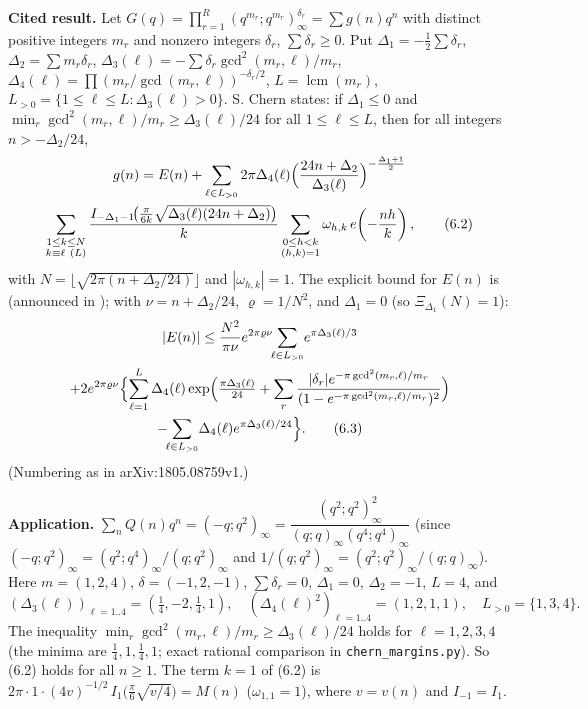\textbf{Cited result.} Let \(G(q)=\prod_{r=1}^{R}(q^{m_r};q^{m_r})_\infty^{\delta_r}=\sum g(n)q^n\) with distinct positive integers \(m_r\) and nonzero integers \(\delta_r\), \(\sum\delta_r\ge0\). Put \(\Delta_1=-\frac12\sum\delta_r\), \(\Delta_2=\sum m_r\delta_r\), \(\Delta_3(\ell)=-\sum\delta_r\gcd^2(m_r,\ell)/m_r\), \(\Delta_4(\ell)=\prod(m_r/\gcd(m_r,\ell))^{-\delta_r/2}\), \(L=\operatorname{lcm}(m_r)\), \(L_{>0}=\{1\le\ell\le L:\Delta_3(\ell)>0\}\). S. Chern \cite[Theorem~1.1]{Chern} states: if \(\Delta_1\le0\) and \(\min_r\gcd^2(m_r,\ell)/m_r\ge\Delta_3(\ell)/24\) for all \(1\le\ell\le L\), then for all integers \(n>-\Delta_2/24\),
\begin{multline}g(n)=E(n)+\sum_{\ell\in L_{>0}}2\pi\Delta_4(\ell)\Bigl(\frac{24n+\Delta_2}{\Delta_3(\ell)}\Bigr)^{-\frac{\Delta_1+1}{2}}\\\sum_{\substack{1\le k\le N\\ k\equiv\ell\ (L)}}\frac{I_{-\Delta_1-1}\!\bigl(\frac{\pi}{6k}\sqrt{\Delta_3(\ell)(24n+\Delta_2)}\bigr)}{k}\sum_{\substack{0\le h<k\\(h,k)=1}}\omega_{h,k}\,e\!\left(-\frac{nh}{k}\right),\tag{6.2}\end{multline}
with \(N=\lfloor\sqrt{2\pi(n+\Delta_2/24)}\rfloor\) and \(|\omega_{h,k}|=1\). The explicit bound for \(E(n)\) is \cite[(3.10)]{Chern} (announced in \cite[Remark~3 after Theorem~1.1]{Chern}); with \(\nu=n+\Delta_2/24\), \(\varrho=1/N^2\), and \(\Delta_1=0\) (so \(\Xi_{\Delta_1}(N)=1\)):
\begin{multline}|E(n)|\le\frac{N^2}{\pi\nu}e^{2\pi\varrho\nu}\!\!\sum_{\ell\in L_{>0}}\!e^{\pi\Delta_3(\ell)/3}\\+2e^{2\pi\varrho\nu}\Bigl\{\sum_{\ell=1}^{L}\Delta_4(\ell)\exp\Bigl(\tfrac{\pi\Delta_3(\ell)}{24}+\sum_{r}\frac{|\delta_r|e^{-\pi\gcd^2(m_r,\ell)/m_r}}{(1-e^{-\pi\gcd^2(m_r,\ell)/m_r})^{2}}\Bigr)\Bigr.\\\Bigl.-\!\!\sum_{\ell\in L_{>0}}\!\Delta_4(\ell)e^{\pi\Delta_3(\ell)/24}\Bigr\}.\tag{6.3}\end{multline}
(Numbering as in arXiv:1805.08759v1.)

\textbf{Application.} \(\sum_{n}Q(n)q^n=(-q;q^2)_\infty=\dfrac{(q^2;q^2)_\infty^2}{(q;q)_\infty(q^4;q^4)_\infty}\) (since \((-q;q^2)_\infty=(q^2;q^4)_\infty/(q;q^2)_\infty\) and \(1/(q;q^2)_\infty=(q^2;q^2)_\infty/(q;q)_\infty\)). Here \(m=(1,2,4)\), \(\delta=(-1,2,-1)\), \(\sum\delta_r=0\), \(\Delta_1=0\), \(\Delta_2=-1\), \(L=4\), and
\[(\Delta_3(\ell))_{\ell=1..4}=(\tfrac14,-2,\tfrac14,1),\quad(\Delta_4(\ell)^2)_{\ell=1..4}=(1,2,1,1),\quad L_{>0}=\{1,3,4\}.\]
The inequality \(\min_r\gcd^2(m_r,\ell)/m_r\ge\Delta_3(\ell)/24\) holds for \(\ell=1,2,3,4\) (the minima are \(\tfrac14,1,\tfrac14,1\); exact rational comparison in \texttt{chern\_margins.py}). So (6.2) holds for all \(n\ge1\). The term \(k=1\) of (6.2) is \(2\pi\cdot1\cdot(4v)^{-1/2}\,I_1\bigl(\frac\pi6\sqrt{v/4}\bigr)=M(n)\) (\(\omega_{1,1}=1\)), where \(v=v(n)\) and \(I_{-1}=I_1\).

